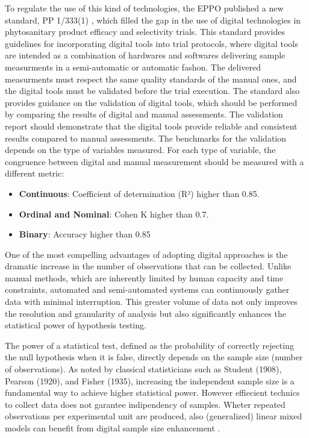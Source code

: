 \documentclass[12pt,a4paper,oneside]{report}
\begin{document}
To regulate the use of this kind of technologies, the EPPO published a new standard, 
PP 1/333(1) \cite{PP13332024}, which 
filled the gap in the use of digital technologies in phytosanitary product efficacy
and selectivity trials. This standard provides guidelines for incorporating digital
tools into trial protocols, where digital tools are intended as a combination of
hardwares and softwares delivering sample measurments 
in a semi-automatic or automatic fashon.
The delivered measurments must respect the same quality standards of the manual
ones, and the digital tools must be validated before the trial execution.
The standard also provides guidance on the validation of digital tools, which should
be performed by comparing the results of digital and manual assessments. The validation
report should demonstrate that the digital tools provide reliable and consistent
results compared to manual assessments. The benchmarks for the validation depends
on the type of variables measured. For each type of variable, the congruence between 
digital and manual measurement should be measured with a different metric:
\begin{itemize}
    \item \textbf{Continuous}: Coefficient of determination (R²) higher than 0.85.
    \item \textbf{Ordinal and Nominal}: Cohen K higher than 0.7.
    \item \textbf{Binary}: Accuracy higher than 0.85
\end{itemize}

One of the most compelling advantages of adopting digital approaches is the
dramatic increase in the number of observations that can be collected. Unlike
manual methods, which are inherently limited by human capacity and time
constraints, automated and semi-automated systems can continuously gather data
with minimal interruption. This greater volume of data not only improves the
resolution and granularity of analysis but also significantly enhances the
statistical power of hypothesis testing.

The power of a statistical test, defined as the probability of correctly
rejecting the null hypothesis when it is false, directly depends on the sample
size (number of observations). As noted by classical statisticians such as
Student (1908), Pearson (1920), and Fisher (1935), increasing the independent sample size
is a fundamental way to achieve higher statistical power. However effiecient technics
to collect data does not garantee indipendency of samples. Wheter repeated observations
per experimental unit are produced, also (generalized) linear mixed models can benefit from 
digital sample size enhancement \cite{kumle_estimating_2021}.
\end{document}
